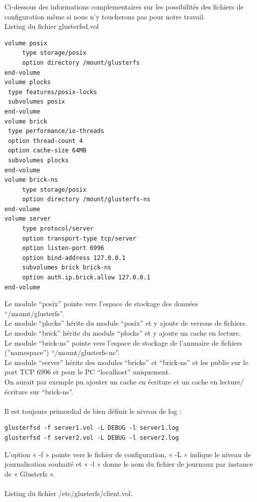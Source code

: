 \documentclass[12pt]{report}
\begin{document}
Ci-dessous des informations complementaires sur les possibilités des fichiers de configuration même si nous n'y toucherons pas pour notre travail.\\
\newpage
Listing du fichier glusterfsd.vol
\begin{lstlisting}
volume posix
     type storage/posix
     option directory /mount/glusterfs
end-volume
volume plocks
 type features/posix-locks
 subvolumes posix
end-volume
volume brick
 type performance/io-threads
 option thread-count 4
 option cache-size 64MB
 subvolumes plocks
end-volume
volume brick-ns
     type storage/posix
     option directory /mount/glusterfs-ns
end-volume
volume server
     type protocol/server
     option transport-type tcp/server
     option listen-port 6996
     option bind-address 127.0.0.1
     subvolumes brick brick-ns
     option auth.ip.brick.allow 127.0.0.1
end-volume
	  \end{lstlisting}
Le module “posix” pointe vers l'espace de stockage des données “/mount/glusterfs”.\\
Le module “plocks” hérite du module “posix” et y ajoute de verrous de fichiers.\\
Le module “brick” hérite du module “plocks” et y ajoute un cache en lecture.\\
Le module “brick-ns” pointe vers l'espace de stockage de l'annuaire de fichiers (”namespace”) “/mount/glusterfs-ns”.\\
Le module “server” hérite des modules “bricks” et “brick-ns” et les publie sur le port TCP 6996 et pour le PC “localhost” uniquement.\\
On aurait par exemple pu ajouter un cache en écriture et un cache en lecture/écriture sur “brick-ns”.\\\\
Il est toujours primordial de bien définir le niveau de log :
\begin{lstlisting}
glusterfsd -f server1.vol -L DEBUG -l server1.log
glusterfsd -f server2.vol -L DEBUG -l server2.log
	  \end{lstlisting}
L'option « -f » pointe vers le fichier de configuration, « -L » indique le niveau de journalisation souhaité et « -l » donne le nom du fichier de journaux par
instance de « Glusterfs ».\\\\
\newpage
Listing du fichier /etc/glusterfs/client.vol.
\end{document}
